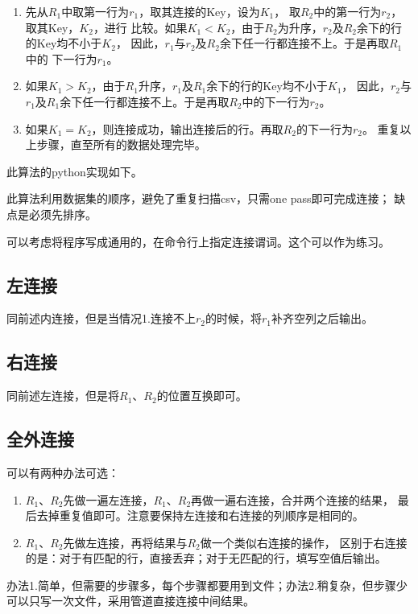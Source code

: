 \documentclass[11pt]{article}
\begin{document}
\begin{enumerate}
  \item 先从$R_1$中取第一行为$r_1$，取其连接的Key，设为$K_1$，
  取$R_2$中的第一行为$r_2$，取其Key，$K_2$，进行
比较。如果$K_1 < K_2$，由于$R_2$为升序，$r_2$及$R_2$余下的行的Key均不小于$K_2$，
因此，$r_1$与$r_2$及$R_2$余下任一行都连接不上。于是再取$R_1$中的
下一行为$r_1$。

  \item 如果$K_1 > K_2$，由于$R_1$升序，$r_1$及$R_1$余下的行的Key均不小于$K_1$，
  因此，$r_2$与$r_1$及$R_1$余下任一行都连接不上。于是再取$R_2$中的下一行为$r_2$。

  \item 如果$K_1 = K_2$，则连接成功，输出连接后的行。再取$R_2$的下一行为$r_2$。
重复以上步骤，直至所有的数据处理完毕。
\end{enumerate}
此算法的python实现如下。


此算法利用数据集的顺序，避免了重复扫描csv，只需one pass即可完成连接；
缺点是必须先排序。

可以考虑将程序写成通用的，在命令行上指定连接谓词。这个可以作为练习。

\subsection{左连接}
同前述内连接，但是当情况1.连接不上$r_2$的时候，将$r_1$补齐空列之后输出。

\subsection{右连接}
同前述左连接，但是将$R_1$、$R_2$的位置互换即可。

\subsection{全外连接}
可以有两种办法可选：
\begin{enumerate}
  \item $R_1$、$R_2$先做一遍左连接，$R_1$、$R_2$再做一遍右连接，合并两个连接的结果，
最后去掉重复值即可。注意要保持左连接和右连接的列顺序是相同的。

 \item $R_1$、$R_2$先做左连接，再将结果与$R_2$做一个类似右连接的操作，
区别于右连接的是：对于有匹配的行，直接丢弃；对于无匹配的行，填写空值后输出。
\end{enumerate}
办法1.简单，但需要的步骤多，每个步骤都要用到文件；办法2.稍复杂，但步骤少
可以只写一次文件，采用管道直接连接中间结果。
\end{document}
